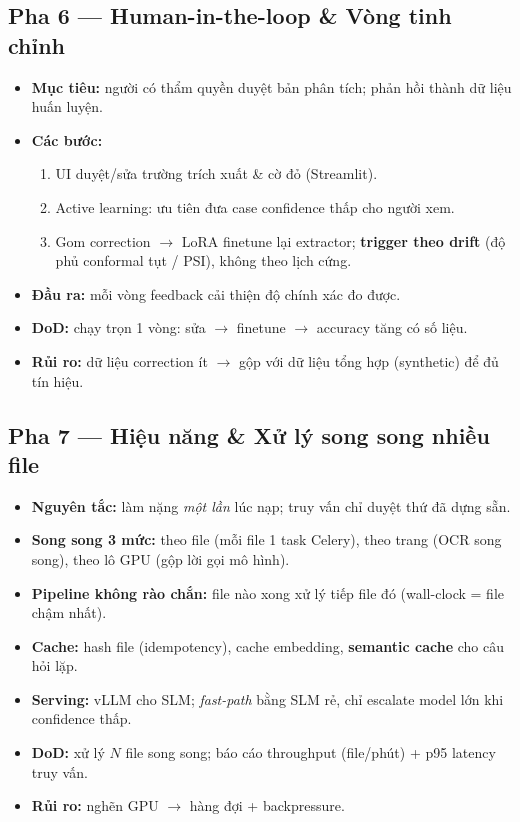 \documentclass[11pt,a4paper]{article}
\newcommand{\pha}[1]{\subsection{#1}}
\begin{document}
\pha{Pha 6 --- Human-in-the-loop \& Vòng tinh chỉnh}
\begin{itemize}
  \item \textbf{Mục tiêu:} người có thẩm quyền duyệt bản phân tích; phản hồi thành dữ liệu huấn luyện.
  \item \textbf{Các bước:}
  \begin{enumerate}
    \item UI duyệt/sửa trường trích xuất \& cờ đỏ (Streamlit).
    \item Active learning: ưu tiên đưa case confidence thấp cho người xem.
    \item Gom correction $\rightarrow$ LoRA finetune lại extractor; \textbf{trigger theo drift} (độ phủ conformal tụt / PSI), không theo lịch cứng.
  \end{enumerate}
  \item \textbf{Đầu ra:} mỗi vòng feedback cải thiện độ chính xác đo được.
  \item \textbf{DoD:} chạy trọn 1 vòng: sửa $\rightarrow$ finetune $\rightarrow$ accuracy tăng có số liệu.
  \item \textbf{Rủi ro:} dữ liệu correction ít $\rightarrow$ gộp với dữ liệu tổng hợp (synthetic) để đủ tín hiệu.
\end{itemize}

\pha{Pha 7 --- Hiệu năng \& Xử lý song song nhiều file}
\begin{itemize}
  \item \textbf{Nguyên tắc:} làm nặng \emph{một lần} lúc nạp; truy vấn chỉ duyệt thứ đã dựng sẵn.
  \item \textbf{Song song 3 mức:} theo file (mỗi file 1 task Celery), theo trang (OCR song song), theo lô GPU (gộp lời gọi mô hình).
  \item \textbf{Pipeline không rào chắn:} file nào xong xử lý tiếp file đó (wall-clock = file chậm nhất).
  \item \textbf{Cache:} hash file (idempotency), cache embedding, \textbf{semantic cache} cho câu hỏi lặp.
  \item \textbf{Serving:} vLLM cho SLM; \emph{fast-path} bằng SLM rẻ, chỉ escalate model lớn khi confidence thấp.
  \item \textbf{DoD:} xử lý $N$ file song song; báo cáo throughput (file/phút) + p95 latency truy vấn.
  \item \textbf{Rủi ro:} nghẽn GPU $\rightarrow$ hàng đợi + backpressure.
\end{itemize}
\end{document}
